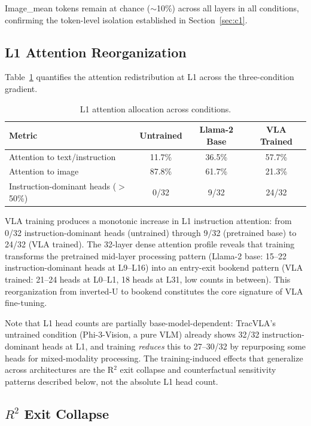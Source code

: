\documentclass[10pt,letterpaper]{article}
\begin{document}
Image\_mean tokens remain at chance ($\sim$10\%) across all layers in all conditions, confirming the token-level isolation established in Section~\ref{sec:c1}.

\subsection{L1 Attention Reorganization}

Table~\ref{tab:l1_attention} quantifies the attention redistribution at L1 across the three-condition gradient.

\begin{table}[h]
\centering
\caption{L1 attention allocation across conditions.}
\label{tab:l1_attention}
\begin{tabular}{lccc}
\toprule
Metric & Untrained & Llama-2 Base & VLA Trained \\
\midrule
Attention to text/instruction & 11.7\% & 36.5\% & 57.7\% \\
Attention to image & 87.8\% & 61.7\% & 21.3\% \\
Instruction-dominant heads ($>$50\%) & 0/32 & 9/32 & 24/32 \\
\bottomrule
\end{tabular}
\end{table}

VLA training produces a monotonic increase in L1 instruction attention: from 0/32 instruction-dominant heads (untrained) through 9/32 (pretrained base) to 24/32 (VLA trained). The 32-layer dense attention profile reveals that training transforms the pretrained mid-layer processing pattern (Llama-2 base: 15--22 instruction-dominant heads at L9--L16) into an entry-exit bookend pattern (VLA trained: 21--24 heads at L0--L1, 18 heads at L31, low counts in between). This reorganization from inverted-U to bookend constitutes the core signature of VLA fine-tuning.

Note that L1 head counts are partially base-model-dependent: TracVLA's untrained condition (Phi-3-Vision, a pure VLM) already shows 32/32 instruction-dominant heads at L1, and training \emph{reduces} this to 27--30/32 by repurposing some heads for mixed-modality processing. The training-induced effects that generalize across architectures are the R$^2$ exit collapse and counterfactual sensitivity patterns described below, not the absolute L1 head count.

\subsection{$R^2$ Exit Collapse}
\label{sec:exit_collapse}
\end{document}
